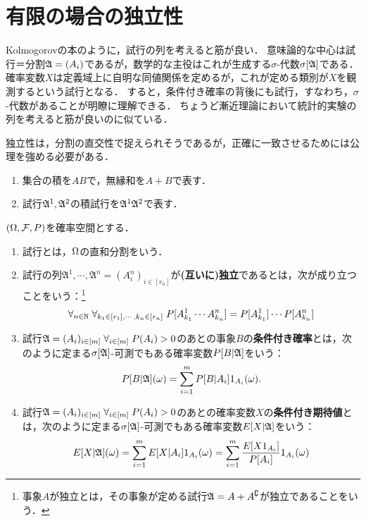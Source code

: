 \documentclass[uplatex,dvipdfmx]{jsreport}
\begin{document}
\section{有限の場合の独立性}

\begin{tcolorbox}[colframe=ForestGreen, colback=ForestGreen!10!white,breakable,colbacktitle=ForestGreen!40!white,coltitle=black,fonttitle=\bfseries\sffamily,
title=]
    Kolmogorovの本のように，試行の列を考えると筋が良い．
    意味論的な中心は試行＝分割$\mathfrak{A}=(A_i)$であるが，数学的な主役はこれが生成する$\sigma$-代数$\sigma[\mathfrak{A}]$である．
    確率変数$X$は定義域上に自明な同値関係を定めるが，これが定める類別が$X$を観測するという試行となる．
    すると，条件付き確率の背後にも試行，すなわち，$\sigma$-代数があることが明瞭に理解できる．
    ちょうど漸近理論において統計的実験の列を考えると筋が良いのに似ている．

    独立性は，分割の直交性で捉えられそうであるが，正確に一致させるためには公理を強める必要がある．
\end{tcolorbox}

\begin{notation}\mbox{}
    \begin{enumerate}
        \item 集合の積を$AB$で，無縁和を$A+B$で表す．
        \item 試行$\mathfrak{A}^1,\mathfrak{A}^2$の積試行を$\mathfrak{A}^1\mathfrak{A}^2$で表す．
    \end{enumerate}
\end{notation}

\begin{definition}
    $(\Omega,\mathcal{F},P)$を確率空間とする．
    \begin{enumerate}
        \item 試行とは，$\Omega$の直和分割をいう．
        \item 試行の列$\mathfrak{A}^1,\cdots,\mathfrak{A}^n=(A^n_i)_{i\in[r_n]}$が\textbf{(互いに)独立}であるとは，次が成り立つことをいう：\footnote{事象$A$が独立とは，その事象が定める試行$\mathfrak{A}=A+A^\complement$が独立であることをいう．}
        \[\forall_{n\in\mathbb{N}}\;\forall_{k_1\in[r_1],\cdots,k_n\in[r_n]}\;P[A^1_{k_1}\cdots A^n_{k_n}]=P[A^1_{k_1}]\cdots P[A^n_{k_n}]\]
        \item 試行$\mathfrak{A}=(A_i)_{i\in[m]}\;\forall_{i\in[m]}\;P(A_i)>0$のあとの事象$B$の\textbf{条件付き確率}とは，次のように定まる$\sigma[\mathfrak{A}]$-可測でもある確率変数$P[B|\mathfrak{A}]$をいう：
        \[P[B|\mathfrak{A}](\omega)=\sum^m_{i=1}P[B|A_i]1_{A_i}(\omega).\]
        \item 試行$\mathfrak{A}=(A_i)_{i\in[m]}\;\forall_{i\in[m]}\;P(A_i)>0$のあとの確率変数$X$の\textbf{条件付き期待値}とは，次のように定まる$\sigma[\mathfrak{A}]$-可測でもある確率変数$E[X|\mathfrak{A}]$をいう：
        \[E[X|\mathfrak{A}](\omega)=\sum_{i=1}^mE[X|A_i]1_{A_i}(\omega)=\sum^m_{i=1}\frac{E[X1_{A_i}]}{P[A_i]}1_{A_i}(\omega)\]
    \end{enumerate}
\end{definition}
\end{document}
